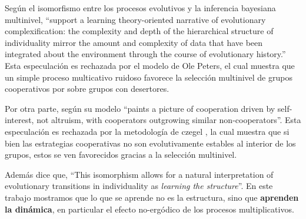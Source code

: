 \documentclass[a4paper,10pt]{article}
\begin{document}
Según \cite{czegel2019-bayesianEvolution} el isomorfismo entre los procesos evolutivos y la inferencia bayesiana multinivel,  ``support a learning theory-oriented narrative of evolutionary complexification: the complexity and depth of the hierarchical structure of individuality mirror the amount and complexity of data that have been integrated about the environment through the course of evolutionary history.''
Esta especulación es rechazada por el modelo de Ole Peters, el cual muestra que un simple proceso multicativo ruidoso favorece la selección multinivel de grupos cooperativos por sobre grupos con desertores.

Por otra parte, según \cite{peters} su modelo ``paints a picture of cooperation driven by self-interest, not altruism, with cooperators outgrowing similar non-cooperators''.
Esta especulación es rechazada por la metodología de czegel \cite{czegel2019-bayesianEvolution}, la cual muestra que si bien las estrategias cooperativas no son evolutivamente estables al interior de los grupos, estos se ven favorecidos gracias a la selección multinivel.

Además \cite{czegel2019-bayesianEvolution} dice que, ``This isomorphism allows for a natural interpretation of evolutionary transitions in individuality as \emph{learning the structure}''.
En este trabajo mostramos que lo que se aprende no es la estructura, sino que \textbf{aprenden la dinámica}, en particular el efecto no-ergódico de los procesos multiplicativos.


% 
{\footnotesize


}
\end{document}
